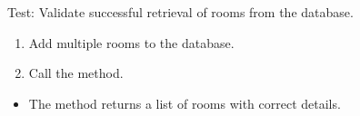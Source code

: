 \documentclass[letterpaper,10pt,english]{sphinxmanual}
\begin{document}
\begin{fulllineitems}
\label{\detokenize{test:test.test_room.test_list_rooms_success}}
\pysigstartsignatures
\pysiglinewithargsret
{}
{}
{}
\pysigstopsignatures
\sphinxAtStartPar
Test: Validate successful retrieval of rooms from the database.
\begin{description}
\begin{enumerate}
%
\item {} 
\sphinxAtStartPar
Add multiple rooms to the database.

\item {} 
\sphinxAtStartPar
Call the  method.

\end{enumerate}

\begin{itemize}
\item {} 
\sphinxAtStartPar
The method returns a list of rooms with correct details.

\end{itemize}

\end{description}

\end{fulllineitems}

\end{document}
